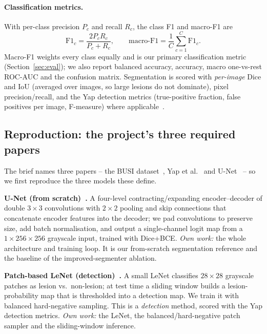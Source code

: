 \documentclass[11pt]{article}
\begin{document}
\paragraph{Classification metrics.}
With per-class precision $P_c$ and recall $R_c$, the class F1 and macro-F1 are
\begin{equation}
\mathrm{F1}_c = \frac{2P_cR_c}{P_c+R_c},\qquad
\text{macro-F1} = \frac{1}{C}\sum_{c=1}^{C}\mathrm{F1}_c .
\end{equation}
Macro-F1 weights every class equally and is our primary classification metric
(Section~\ref{sec:eval}); we also report balanced accuracy, accuracy, macro
one-vs-rest ROC-AUC and the confusion matrix. Segmentation is scored with
\emph{per-image} Dice and IoU (averaged over images, so large lesions do not
dominate), pixel precision/recall, and the Yap detection metrics
(true-positive fraction, false positives per image, F-measure) where
applicable~\cite{yap2018cnn}.

\subsection{Reproduction: the project's three required papers}
\label{sec:repro3}
The brief names three papers -- the BUSI dataset~\cite{aldhabyani2020busi}, Yap et
al.~\cite{yap2018cnn} and U-Net~\cite{ronneberger2015unet} -- so we first
reproduce the three models these define.

\textbf{U-Net (from scratch)~\cite{ronneberger2015unet}.} A four-level
contracting/expanding encoder--decoder of double $3\times3$ convolutions with
$2\times2$ pooling and skip connections that concatenate encoder features into the
decoder; we pad convolutions to preserve size, add batch normalisation, and output
a single-channel logit map from a $1\times256\times256$ grayscale input, trained
with Dice+BCE. \emph{Own work:} the whole architecture and training loop. It is
our from-scratch segmentation reference and the baseline of the improved-segmenter
ablation.

\textbf{Patch-based LeNet (detection)~\cite{yap2018cnn}.} A small LeNet classifies
$28\times28$ grayscale patches as lesion vs.\ non-lesion; at test time a sliding
window builds a lesion-probability map that is thresholded into a detection map.
We train it with balanced hard-negative sampling. This is a \emph{detection}
method, scored with the Yap detection metrics. \emph{Own work:} the LeNet, the
balanced/hard-negative patch sampler and the sliding-window inference.
\end{document}
